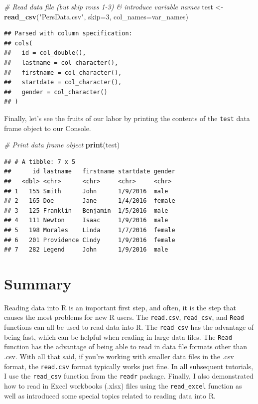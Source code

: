 \documentclass[]{book}
\newenvironment{Shaded}{\begin{snugshade}}{\end{snugshade}}
\newcommand{\KeywordTok}[1]{\textcolor[rgb]{0.13,0.29,0.53}{\textbf{#1}}}
\newcommand{\DataTypeTok}[1]{\textcolor[rgb]{0.13,0.29,0.53}{#1}}
\newcommand{\DecValTok}[1]{\textcolor[rgb]{0.00,0.00,0.81}{#1}}
\newcommand{\StringTok}[1]{\textcolor[rgb]{0.31,0.60,0.02}{#1}}
\newcommand{\CommentTok}[1]{\textcolor[rgb]{0.56,0.35,0.01}{\textit{#1}}}
\newcommand{\NormalTok}[1]{#1}
\begin{document}
\begin{Shaded}
\begin{Highlighting}[]
\CommentTok{# Read data file (but skip rows 1-3) & introduce variable names}
\NormalTok{test <-}\StringTok{ }\KeywordTok{read_csv}\NormalTok{(}\StringTok{"PersData.csv"}\NormalTok{, }
                     \DataTypeTok{skip=}\DecValTok{3}\NormalTok{,}
                     \DataTypeTok{col_names=}\NormalTok{var_names)}
\end{Highlighting}
\end{Shaded}

\begin{verbatim}
## Parsed with column specification:
## cols(
##   id = col_double(),
##   lastname = col_character(),
##   firstname = col_character(),
##   startdate = col_character(),
##   gender = col_character()
## )
\end{verbatim}

Finally, let's see the fruits of our labor by printing the contents of
the \texttt{test} data frame object to our Console.

\begin{Shaded}
\begin{Highlighting}[]
\CommentTok{# Print data frame object}
\KeywordTok{print}\NormalTok{(test)}
\end{Highlighting}
\end{Shaded}

\begin{verbatim}
## # A tibble: 7 x 5
##      id lastname   firstname startdate gender
##   <dbl> <chr>      <chr>     <chr>     <chr> 
## 1   155 Smith      John      1/9/2016  male  
## 2   165 Doe        Jane      1/4/2016  female
## 3   125 Franklin   Benjamin  1/5/2016  male  
## 4   111 Newton     Isaac     1/9/2016  male  
## 5   198 Morales    Linda     1/7/2016  female
## 6   201 Providence Cindy     1/9/2016  female
## 7   282 Legend     John      1/9/2016  male
\end{verbatim}

\section{Summary}\label{summary}

Reading data into R is an important first step, and often, it is the
step that causes the most problems for new R users. The
\texttt{read.csv}, \texttt{read\_csv}, and \texttt{Read} functions can
all be used to read data into R. The \texttt{read\_csv} has the
advantage of being fast, which can be helpful when reading in large data
files. The \texttt{Read} function has the advantage of being able to
read in data file formats other than .csv. With all that said, if you're
working with smaller data files in the .csv format, the
\texttt{read.csv} format typically works just fine. In all subsequent
tutorials, I use the \texttt{read\_csv} function from the \texttt{readr}
package. Finally, I also demonstrated how to read in Excel workbooks
(.xlsx) files using the \texttt{read\_excel} function as well as
introduced some special topics related to reading data into R.
\end{document}

